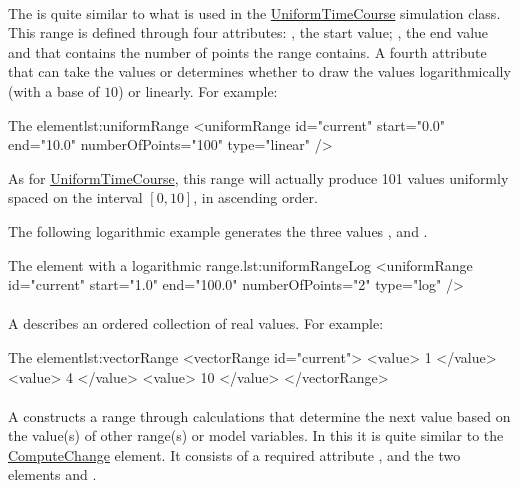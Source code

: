 \paragraph{}
\label{class:uniformRange}
The  is quite similar to what is used in the \hyperref[class:uniformTimeCourse]{UniformTimeCourse} simulation class. This range is defined through four attributes: , the start value; , the end value and  that contains the number of points the range contains. A fourth attribute  that can take the values  or  determines whether to draw the values logarithmically (with a base of $10$) or linearly.  For example:
\begin{myXmlLst}{The  element}{lst:uniformRange}
    <uniformRange id="current" start="0.0" end="10.0" numberOfPoints="100" type="linear" /> 
\end{myXmlLst}
As for \hyperref[class:uniformTimeCourse]{UniformTimeCourse}, this range will actually produce 101 values uniformly spaced on the interval $[0, 10]$, in ascending order.

The following logarithmic example generates the three values ,  and .
\begin{myXmlList}{The  element with a logarithmic range.}{lst:uniformRangeLog}
    <uniformRange id="current" start="1.0" end="100.0" numberOfPoints="2" type="log" />
\end{myXmlList}

\paragraph{}
\label{class:vectorRange}
A  describes an ordered collection of real values. For example:
\begin{myXmlLst}{The  element}{lst:vectorRange}
    <vectorRange id="current"> 
        <value> 1 </value> 
        <value> 4 </value> 
        <value> 10 </value> 
    </vectorRange> 
\end{myXmlLst}

\paragraph{}
\label{class:functionalRange}
A  constructs a range through calculations that determine the next value based on the value(s) of other range(s) or model variables.
In this it is quite similar to the \hyperref[class:computeChange]{ComputeChange} element.
It consists of a required attribute , and the two elements  and .

